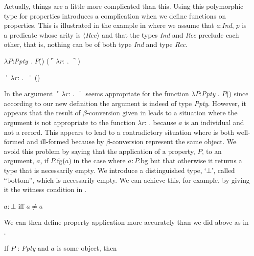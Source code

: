 \begin{shaded}
  Actually, things are a little more complicated than this.  Using
  this polymorphic type for properties introduces a complication when
  we define functions on properties. This is illustrated in the
  example in \nexteg{} where we assume that $a$:\textit{Ind}, $p$
  is a predicate whose arity is $\langle\textit{Rec}\rangle$ and that
  the types \textit{Ind} and \textit{Rec} preclude each other, that
  is, nothing can be of both type \textit{Ind} and type \textit{Rec}.
  \begin{ex} 
\begin{subex} 
 
\item $\lambda P$:\textit{Ppty} . $P$()
  ($\ulcorner\lambda r$: . $\urcorner$) 
 
\item $\ulcorner\lambda r$:
  . $\urcorner$ () 
 
\end{subex} 
   
\end{ex}
In  the argument $\ulcorner\lambda
r$:
. $\urcorner$ seems appropriate for the
function $\lambda P$:\textit{Ppty} . $P$()
since according to our new definition the argument is indeed of type
\textit{Ppty}.  However, it appears that the result of
$\beta$-conversion given in  leads to a situation where the
argument  is not appropriate to the
function $\lambda r$:
.  because $a$ is an individual and not
a record.  This appears to lead to a contradictory situation where
 is both well-formed and ill-formed because by
$\beta$-conversion  represent the same object.  We
avoid this problem by saying that the application of a property, $P$,
to an argument, $a$, if $P$.fg($a$) in the case where $a:P$.bg but
that otherwise it returns a type that is necessarily empty.  We
introduce a distinguished type, `$\bot$', called ``bottom'', which is
necessarily empty.  We can achieve this, for example, by giving it the
witness condition in \nexteg{}.
\begin{ex} 
$a:\bot$ iff $a\not=a$ 
\end{ex} 
We can then define property application more accurately than we did
above as in \nexteg{}.
\begin{ex} 
  If $P$ : \textit{Ppty} and $a$ is some object, then
  \begin{enumerate} 
 

\end{enumerate}
\end{ex}
\end{shaded}
